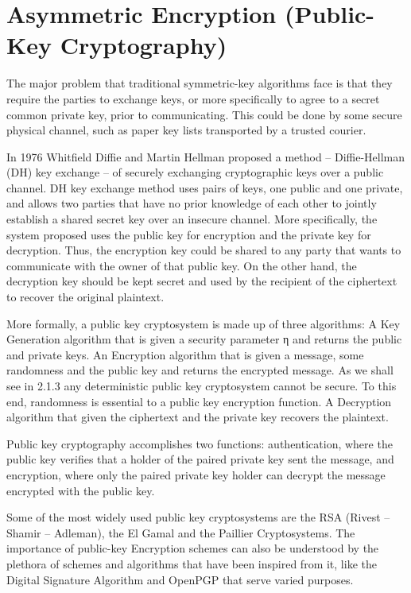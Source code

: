 \section{Asymmetric Encryption (Public-Key Cryptography)}\label{s:public-key-encryption}
The major problem that traditional symmetric-key algorithms face is that they require the parties to exchange keys, or more specifically to agree to a secret common private key, prior to communicating.
This could be done by some secure physical channel, such as paper key lists transported by a trusted courier.

In 1976 Whitfield Diffie and Martin Hellman proposed a method – Diffie-Hellman (DH) key exchange – of securely exchanging cryptographic keys over a public channel.
DH key exchange method uses pairs of keys, one public and one private, and allows two parties that have no prior knowledge of each other to jointly establish a shared secret key over an insecure channel. More specifically, the system proposed uses the public key for encryption and the private key for decryption.
Thus, the encryption key could be shared to any party that wants to communicate with the owner of that public key.
On the other hand, the decryption key should be kept secret and used by the recipient of the ciphertext to recover the original plaintext.

More formally, a public key cryptosystem is made up of three algorithms:
A Key Generation algorithm that is given a security parameter η and returns the public and private keys.
An Encryption algorithm that is given a message, some randomness and the public key and returns the encrypted message.
As we shall see in 2.1.3 any deterministic public key cryptosystem cannot be secure. To this end, randomness is essential to a public key encryption function.
A Decryption algorithm that given the ciphertext and the private key recovers the plaintext.

Public key cryptography accomplishes two functions: authentication, where the public key verifies that a holder of the paired private key sent the message, and encryption, where only the paired private key holder can decrypt the message encrypted with the public key.

Some of the most widely used public key cryptosystems are the RSA (Rivest – Shamir – Adleman), the El Gamal and the Paillier Cryptosystems.
The importance of public-key Encryption schemes can also be understood by the plethora of schemes and algorithms that have been inspired from it, like the Digital Signature Algorithm and OpenPGP that serve varied purposes.
